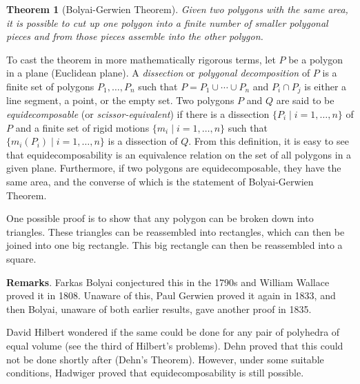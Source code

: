 \documentclass[12pt]{article}
\newtheorem{thm}{Theorem}
\begin{document}
\begin{thm}  [Bolyai-Gerwien Theorem]  Given two polygons with the same area, it is possible to cut up one polygon into a finite number of smaller polygonal pieces and from those pieces assemble into the other polygon. 
\end{thm}

To cast the theorem in more mathematically rigorous terms, let $P$ be a polygon in a plane (Euclidean plane).  A \emph{dissection} or \emph{polygonal decomposition} of $P$ is a finite set of polygons $P_1,\ldots, P_n$ such that $P=P_1\cup \cdots \cup P_n$ and $P_i\cap P_j$ is either a line segment, a point, or the empty set.  Two polygons $P$ and $Q$ are said to be \emph{equidecomposable} (or \emph{scissor-equivalent}) if there is a dissection $\lbrace P_i\mid i=1,\ldots, n \rbrace$ of $P$ and a finite set of rigid motions $\lbrace m_i\mid i=1,\ldots, n\rbrace$ such that $\lbrace m_i(P_i)\mid i=1,\ldots, n\rbrace$ is a dissection of $Q$.  From this definition, it is easy to see that equidecomposability is an equivalence relation on the set of all polygons in a given plane.  Furthermore, if two polygons are equidecomposable, they have the same area, and the converse of which is the statement of Bolyai-Gerwien Theorem.

One possible proof is to show that any polygon can be broken down into triangles. These triangles can be reassembled into rectangles, which can then be joined into one big rectangle. This big rectangle can then be reassembled into a square.

\textbf{Remarks}.  Farkas Bolyai conjectured this in the 1790s and William Wallace proved it in 1808. Unaware of this, Paul Gerwien proved it again in 1833, and then Bolyai, unaware of both earlier results, gave another proof in 1835.

David Hilbert wondered if the same could be done for any pair of polyhedra of equal volume (see the third of Hilbert's problems).  Dehn proved that this could not be done shortly after (Dehn's Theorem).  However, under some suitable conditions, Hadwiger proved that equidecomposability is still possible.
\end{document}
